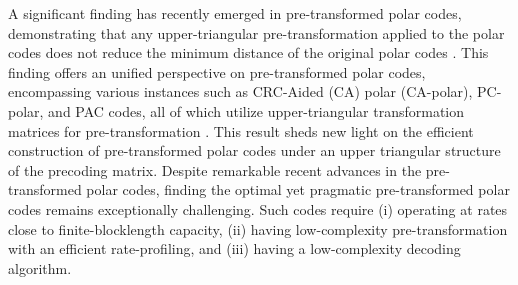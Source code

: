 \documentclass[conference]{IEEEtran}
\begin{document}

A significant finding has recently emerged in pre-transformed polar codes, demonstrating that any upper-triangular pre-transformation applied to the polar codes does not reduce the minimum distance of the original polar codes \cite{li-pretransformed, li-pretransformed-average}. This finding offers an unified perspective on pre-transformed polar codes, encompassing various instances such as CRC-Aided (CA) polar (CA-polar), PC-polar, and PAC codes, all of which utilize upper-triangular transformation matrices for pre-transformation \cite{Niu-CA-polar, Wang-PCC-polar, Trifonov-polar-dynamic-frozen, Trifonov-polar-subcode, Zhang-PC-polar-Huawei, arikan-pac, Zhou-segmented-CApolar-SCL, Liang-segmented-BCH-CApolar-SCL, Gelincik-polar-row-merging}. This result sheds new light on the efficient construction of pre-transformed polar codes under an upper triangular structure of the precoding matrix. Despite remarkable recent advances in the pre-transformed polar codes, finding the optimal yet pragmatic pre-transformed polar codes remains exceptionally challenging. Such codes require (i) operating at rates close to finite-blocklength capacity, (ii) having low-complexity pre-transformation with an efficient rate-profiling, and (iii) having a low-complexity decoding algorithm. 


 
 


%
%
%
%
\end{document}
